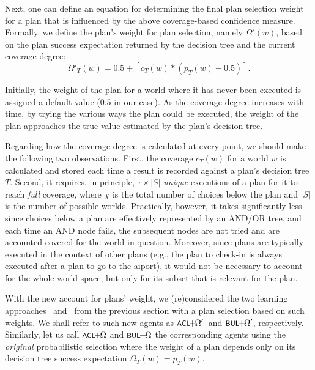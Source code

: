Next,	 one can define an equation for determining the final plan selection
weight for a plan that is influenced by the above coverage-based confidence measure.
Formally, we define the plan's weight for plan selection, namely $\Omega'(w)$, based
on the plan success expectation returned by the decision tree and the current
coverage degree:
%
\begin{equation*}\label{eqn:coverage}   
\Omega'_T(w) = 0.5 + \left[  c_T(w) *  \left( p_T(w) - 0.5 \right)  \right].
\end{equation*}
	
	
Initially, the weight of the plan for a world where it has never been executed is
assigned a default value ($0.5$ in our case).
As the coverage degree increases with time, by trying the various ways the plan
could be executed, the weight of the plan approaches the true value estimated by
the plan's decision tree.



Regarding how the coverage degree is calculated at every point, we should make
the following two observations.
First, the coverage $c_T(w)$ for a world $w$ is calculated and stored each time a
result is recorded against a plan's decision tree $T$.
Second, it requires, in principle, $\tau \times |S|$ \emph{unique} executions of
a plan for it to reach \emph{full} coverage, where $\chi$ is the total number of
choices below the plan and $|S|$ is the number of possible worlds. Practically,
however, it takes significantly less since choices below a plan are effectively
represented by an AND/OR tree, and each time an AND node fails, the subsequent
nodes are not tried and are accounted covered for the world in question.
Moreover, since plans are typically executed in the context of other plans
(e.g., the plan to check-in is always executed after a plan to go to the
aiport), it would not be necessary to account for the whole world space, but
only for its subset that is relevant for the plan.

\newcommand{\CLSELA}{\mbox{$\CL\!\!+\!\!\Omega$}}
\newcommand{\CLSELB}{\mbox{$\CL\!\!+\!\!\Omega'$}}
\newcommand{\BULSELA}{\mbox{$\BUL\!\!+\!\!\Omega$}}
\newcommand{\BULSELB}{\mbox{$\BUL\!\!+\!\!\Omega'$}}

\medskip With the new account for plans' weight, we (re)considered the two
learning approaches \CL\ and \BUL\ from the previous section with a plan
selection based on such weights. We shall refer to such new agents as \CLSELB\
and \BULSELB, respectively.
Similarly, let us call $\CLSELA$ and $\BULSELA$ the corresponding agents using
the \emph{original} probabilistic selection where the weight of a plan depends
only on its decision tree success expectation $\Omega_T(w) = p_T(w)$.



